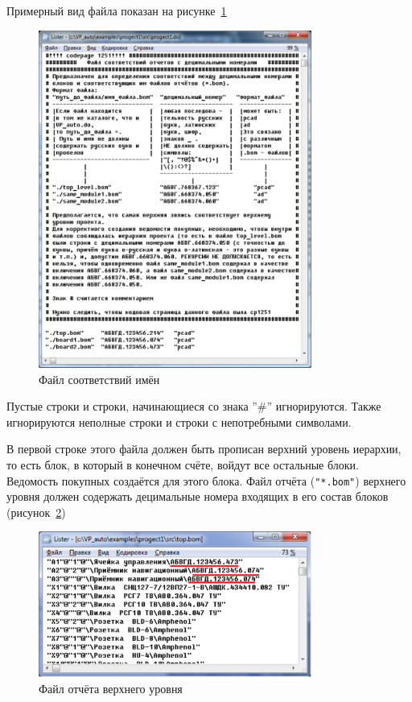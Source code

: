 Примерный вид файла показан на рисунке~\ref{p:pic_vp_auto_do_file}

\begin{figure}[H]\center
  \includegraphics[width=0.8\textwidth]{VP_auto/pictures/pic_vp_auto_do_file}
  \caption{Файл соответствий имён} \label{p:pic_vp_auto_do_file}
\end{figure}

\newpage
Пустые строки и строки, начинающиеся со знака ''\#'' игнорируются. Также игнорируются неполные строки и строки с непотребными символами.

В первой строке этого файла должен быть прописан верхний уровень иерархии, то есть блок, в который в конечном счёте, войдут все остальные блоки. Ведомость покупных создаётся для этого блока. Файл отчёта (\verb|"*.bom"|) верхнего уровня должен содержать децимальные номера входящих в его состав блоков (рисунок~\ref{p:pic_pcad_top_bom_file})

\begin{figure}[H]\center
  \includegraphics[width=0.8\textwidth]{VP_auto/pictures/pcad/pic_pcad_top_bom_file}
  \caption{Файл отчёта верхнего уровня} \label{p:pic_pcad_top_bom_file}
\end{figure}

